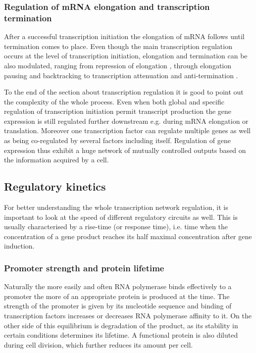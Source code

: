 \subsubsection{Regulation of mRNA elongation and transcription termination}
After a successful transcription initiation the elongation of mRNA follows until termination comes to place.
Even though the main transcription regulation occurs at the level of transcription initiation, elongation and termination can be also modulated, ranging from repression of elongation \cite{monsalve1996protein}, through elongation pausing and backtracking \cite{mustaev2017transcription} to transcription attenuation and anti-termination \cite{naville2009transcription}.

To the end of the section about transcription regulation it is good to point out the complexity of the whole process.
Even when both global and specific regulation of transcription initiation permit transcript production the gene expression is still regulated further downstream e.g. during mRNA elongation or translation.
Moreover one transcription factor can regulate multiple genes as well as being co-regulated by several factors including itself.
Regulation of gene expression thus exhibit a huge network of mutually controlled outputs based on the information acquired by a cell.

\subsection{Regulatory kinetics}
For better understanding the whole transcription network regulation, it is important to look at the speed of different regulatory circuits as well.
This is usually characterised by a rise-time (or response time), i.e. time when the concentration of a gene product reaches its half maximal concentration after gene induction.

\subsubsection{Promoter strength and protein lifetime}
Naturally the more easily and often RNA polymerase binds effectively to a promoter the more of an appropriate protein is produced at the time.
The strength of the promoter is given by its nucleotide sequence and binding of transcription factors increases or decreases RNA polymerase affinity to it.
On the other side of this equilibrium is degradation of the product, as its stability in certain conditions determines its lifetime.
A functional protein is also diluted during cell division, which further reduces its amount per cell.

